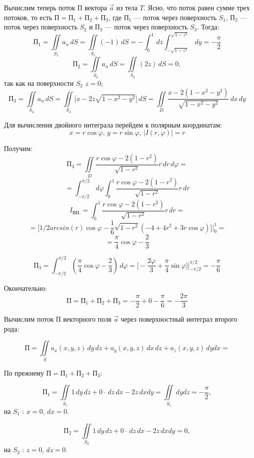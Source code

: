\documentclass[12pt]{article}
\begin{document}
	Вычислим теперь поток $ П $ вектора $ \vec{a} $ из тела $ T $. Ясно, что поток равен сумме трех потоков, то есть $ П = П_1 + П_2 + П_3 $, где $ П_1 $ --- поток через поверхность $ S_1 $, $ П_2 $ --- поток через поверхность $ S_2 $ и $ П_3 $ --- поток через поверхность $ S_3 $. Тогда:
	$$ П_1 = \iint \limits_{S_1} a_n \, dS = \iint \limits_{S_1} (-1) \, dS = - \int_0^1 \,dz \int_{-\sqrt{1-z^2}}^{\sqrt{1-z^2}} \, dy = - \frac{\pi}{2} $$
	$$ П_2 = \iint \limits_{S_2} a_n \, dS = \iint \limits_{S_2} (2z) \, dS = 0, $$
	так как на поверхности $ S_2 $ $ z = 0 $;
	$$ П_3 = \iint \limits_{S_3} a_n \, dS = \iint \limits_{S_3} \Big[ x - 2z \sqrt{1 - x^2 - y^2} \Big] \, dS = \iint \limits_{D} \frac{x - 2(1 - x^2 - y^2)}{\sqrt{1 - x^2 - y^2}}\,dx\,dy $$ 

	Для вычисления двойного интеграла перейдем к полярным координатам:	
	$$ x = r \cos{\varphi}, \, y = r \sin{\varphi}, \, | I(r,\varphi) | = r $$

	Получим:
	$$ П_3 = \iint \limits_{D} \frac{r \cos{\varphi} - 2(1 - r^2)}{\sqrt{1 - r^2}} r \, dr \, d\varphi = $$
	$$ = \int_{-\pi/2}^{\pi/2} \, d\varphi \int_0^1 \frac{r \cos{\varphi} - 2(1 - r^2)}{\sqrt{1 - r^2}} r \, dr $$
	$$ I_{ВН.} = \int_0^1 \frac{r \cos{\varphi} - 2(1 - r^2)}{\sqrt{1 - r^2}} r \, dr = $$
	$$ = \Big[ 1/2 arcsin(r) \cos{\varphi} - \frac{1}{6} \sqrt{1 - r^2} (-4 + 4 r^2 + 3 r \cos{\varphi}) \Big] \Big|_0^1 =  $$
	$$ = \frac{\pi}{4} \cos{\varphi} - \frac{2}{3} $$
	
	$$ П_3 =  \int_{-\pi/2}^{\pi/2} (\frac{\pi}{4} \cos{\varphi} - \frac{2}{3}) \, d\varphi = \Big[ -\frac{2 \varphi}{3} + \frac{\pi}{4} \sin{\varphi} \Big] \Big|_{-\pi/2}^{\pi/2} = - \frac{\pi}{6} $$

	Окончательно:
	$$ П = П_1 + П_2 + П_3 = - \frac{\pi}{2} + 0 - \frac{\pi}{6}  = - \frac{2\pi}{3} $$

	Вычислим поток $ П $ векторного поля $ \vec{a} $ через поверхностный интеграл второго рода:
		
	$$ П = \iint \limits_{S} a_x(x,y,z)\,dy\,dz + a_y(x,y,z)\,dx\,dz + a_z(x,y,z) \, dy dx = $$

	По прежнему $ П = П_1 + П_2 + П_3 $:

	$$ П_1 = \iint \limits_{S_1} 1 \, dy \, dz + 0 \cdot \, dz \, dx - 2z \, dx dy = \iint \limits_{S_1} \, dy dz = - \frac{\pi}{2} ,$$
	на $ S_1 $ : $ x = 0 $, $ dx = 0 $.

	$$ П_2 = \iint \limits_{S_2} 1 \, dy \, dz + 0 \cdot \, dz \, dx - 2z \, dx dy = 0 ,$$
	на $ S_2 $ : $ z = 0 $, $ dz = 0 $.	
\end{document}
